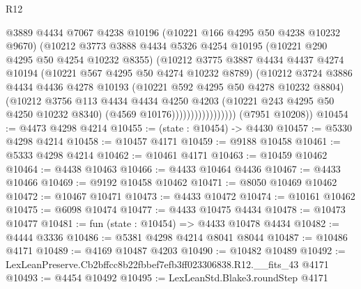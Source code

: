 \begin{lexlean}{R12}
\begin{coremodule}
                              @3889
                              @4434
                              @7067
                              @4238
                              @10196
                              (@10221 @166 @4295 @50 @4238 @10232 @9670)
                              (@10212
                                @3773
                                @3888
                                @4434
                                @5326
                                @4254
                                @10195
                                (@10221 @290 @4295 @50 @4254 @10232 @8355)
                                (@10212
                                  @3775
                                  @3887
                                  @4434
                                  @4437
                                  @4274
                                  @10194
                                  (@10221 @567 @4295 @50 @4274 @10232 @8789)
                                  (@10212
                                    @3724
                                    @3886
                                    @4434
                                    @4436
                                    @4278
                                    @10193
                                    (@10221 @592 @4295 @50 @4278 @10232 @8804)
                                    (@10212
                                      @3756
                                      @113
                                      @4434
                                      @4434
                                      @4250
                                      @4203
                                      (@10221 @243 @4295 @50 @4250 @10232 @8340)
                                      (@4569 @10176)))))))))))))))))
      (@7951 @10208))
@10454 := @4473 @4298 @4214
@10455 := (state : @10454) -> @4430
@10457 := @5330 @4298 @4214
@10458 := @10457 @4171
@10459 := @9188 @10458
@10461 := @5333 @4298 @4214
@10462 := @10461 @4171
@10463 := @10459 @10462
@10464 := @4438 @10463
@10466 := @4433 @10464 @4436
@10467 := @4433 @10466
@10469 := @9192 @10458 @10462
@10471 := @8050 @10469 @10462
@10472 := @10467 @10471
@10473 := @4433 @10472
@10474 := @10161 @10462
@10475 := @6098 @10474
@10477 := @4433 @10475 @4434
@10478 := @10473 @10477
@10481 := fun (state : @10454) => @4433 @10478 @4434
@10482 := @4444 @3336
@10486 := @5381 @4298 @4214 @8041 @8044
@10487 := @10486 @4171
@10489 := @4169 @10487 @4203
@10490 := @10482 @10489
@10492 := LexLeanPreserve.Cb2bffcc8b22fbbef7efb3ff023306838.R12.__fits_43 @4171
@10493 := @4454 @10492
@10495 := LexLeanStd.Blake3.roundStep @4171

\end{coremodule}
\end{lexlean}
